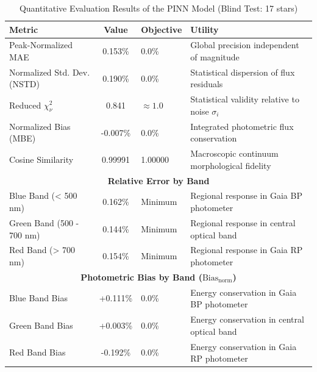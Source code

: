 
\begin{table}[htpb]
\centering
\caption{Quantitative Evaluation Results of the PINN Model (Blind Test: 17 stars)}
\label{tab:pinn_evaluation}
\begin{tabular}{lcll}
\hline
\textbf{Metric} & \textbf{Value} & \textbf{Objective} & \textbf{Utility} \\
\hline
Peak-Normalized MAE & 0.153\% & 0.0\% & Global precision independent of magnitude \\
Normalized Std. Dev. (NSTD) & 0.190\% & 0.0\% & Statistical dispersion of flux residuals \\
Reduced $\chi^2_\nu$ & 0.841 & $\approx 1.0$ & Statistical validity relative to noise $\sigma_i$ \\
Normalized Bias (MBE) & -0.007\% & 0.0\% & Integrated photometric flux conservation \\
Cosine Similarity & 0.99991 & 1.00000 & Macroscopic continuum morphological fidelity \\
\hline
\multicolumn{4}{c}{\textbf{Relative Error by Band}} \\
\hline
Blue Band (< 500 nm) & 0.162\% & Minimum & Regional response in Gaia BP photometer \\
Green Band (500 - 700 nm) & 0.144\% & Minimum & Regional response in central optical band \\
Red Band (> 700 nm) & 0.154\% & Minimum & Regional response in Gaia RP photometer \\
\hline
\multicolumn{4}{c}{\textbf{Photometric Bias by Band ($\text{Bias}_{\text{norm}}$)}} \\
\hline
Blue Band Bias & +0.111\% & 0.0\% & Energy conservation in Gaia BP photometer \\
Green Band Bias & +0.003\% & 0.0\% & Energy conservation in central optical band \\
Red Band Bias & -0.192\% & 0.0\% & Energy conservation in Gaia RP photometer \\
\hline
\end{tabular}
\end{table}
